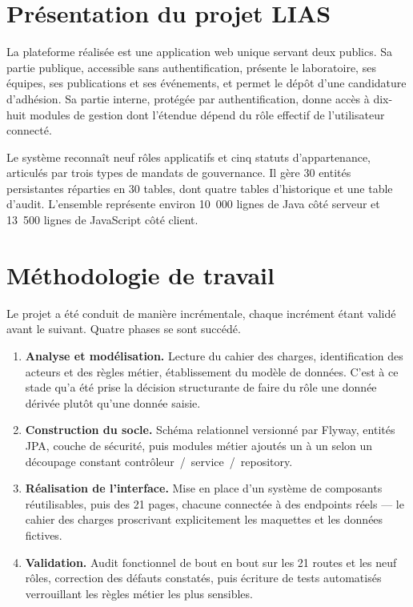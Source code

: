 \section{Présentation du projet LIAS}

La plateforme réalisée est une application web unique servant deux publics. Sa partie
publique, accessible sans authentification, présente le laboratoire, ses équipes, ses
publications et ses événements, et permet le dépôt d'une candidature d'adhésion. Sa partie
interne, protégée par authentification, donne accès à dix-huit modules de gestion dont
l'étendue dépend du rôle effectif de l'utilisateur connecté.

Le système reconnaît neuf rôles applicatifs et cinq statuts d'appartenance, articulés par
trois types de mandats de gouvernance. Il gère 30 entités persistantes réparties en 30
tables, dont quatre tables d'historique et une table d'audit. L'ensemble représente
environ 10~000 lignes de Java côté serveur et 13~500 lignes de JavaScript côté client.

\section{Méthodologie de travail}

Le projet a été conduit de manière incrémentale, chaque incrément étant validé avant le
suivant. Quatre phases se sont succédé.

\begin{enumerate}
  \item \textbf{Analyse et modélisation.} Lecture du cahier des charges, identification
        des acteurs et des règles métier, établissement du modèle de données. C'est à ce
        stade qu'a été prise la décision structurante de faire du rôle une donnée dérivée
        plutôt qu'une donnée saisie.
  \item \textbf{Construction du socle.} Schéma relationnel versionné par Flyway, entités
        JPA, couche de sécurité, puis modules métier ajoutés un à un selon un découpage
        constant contrôleur~/~service~/~repository.
  \item \textbf{Réalisation de l'interface.} Mise en place d'un système de composants
        réutilisables, puis des 21 pages, chacune connectée à des endpoints réels --- le
        cahier des charges proscrivant explicitement les maquettes et les données fictives.
  \item \textbf{Validation.} Audit fonctionnel de bout en bout sur les 21 routes et les
        neuf rôles, correction des défauts constatés, puis écriture de tests automatisés
        verrouillant les règles métier les plus sensibles.
\end{enumerate}

